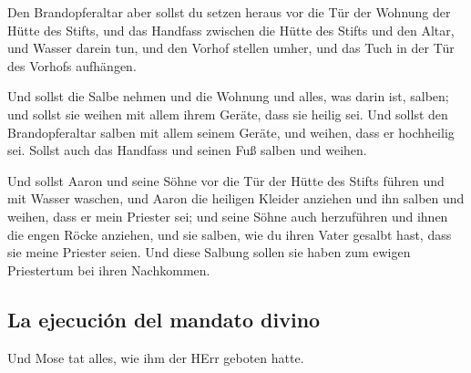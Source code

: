  Den Brandopferaltar aber sollst du setzen heraus vor die
Tür der Wohnung der Hütte des Stifts,  und das Handfass
zwischen die Hütte des Stifts und den Altar, und Wasser darein tun,
 und den Vorhof stellen umher, und das Tuch in der Tür des
Vorhofs aufhängen.

 Und sollst die Salbe nehmen und die Wohnung und alles,
was darin ist, salben; und sollst sie weihen mit allem ihrem Geräte,
dass sie heilig sei.  Und sollst den Brandopferaltar
salben mit allem seinem Geräte, und weihen, dass er hochheilig sei.
 Sollst auch das Handfass und seinen Fuß salben und
weihen.

 Und sollst Aaron und seine Söhne vor die Tür der Hütte
des Stifts führen und mit Wasser waschen,  und Aaron die
heiligen Kleider anziehen und ihn salben und weihen, dass er mein
Priester sei;  und seine Söhne auch herzuführen und ihnen
die engen Röcke anziehen,  und sie salben, wie du ihren
Vater gesalbt hast, dass sie meine Priester seien. Und diese Salbung
sollen sie haben zum ewigen Priestertum bei ihren Nachkommen.

\hypertarget{la-ejecuciuxf3n-del-mandato-divino}{%
\subsection{La ejecución del mandato
divino}\label{la-ejecuciuxf3n-del-mandato-divino}}

 Und Mose tat alles, wie ihm der HErr geboten hatte.

